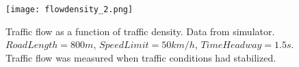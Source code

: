 \begin{figure}[h!]
    \begin{center}
    \texttt{[image: flowdensity\_2.png]}
    \caption{\label{performance}
Traffic flow as a function of traffic density. Data from simulator.
$ RoadLength=800 \unit{m} $, $ SpeedLimit=50 \unit{km/h} $, $ TimeHeadway=1.5
\unit{s} $. Traffic flow was measured when traffic conditions had stabilized.}
    \end{center}
\end{figure}


